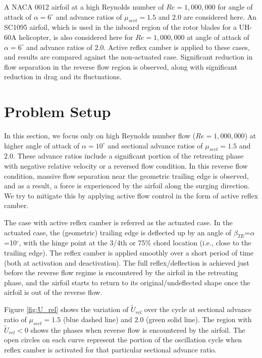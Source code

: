 A NACA 0012 airfoil at a high Reynolds number of $Re=1,000,000$ for angle of attack of $\alpha=6^\circ$ and advance ratios of $\mu_{sect}=1.5$ and $2.0$ are considered here.
An SC1095 airfoil, which is used in the inboard region of the rotor blades for a UH-60A helicopter, is also considered here for $Re=1,000,000$ at angle of attack of $\alpha=6^\circ$ and advance ratios of $2.0$.
Active reflex camber is applied to these cases, and results are compared against the non-actuated case.
Significant reduction in flow separation in the reverse flow region is observed, along with significant reduction in drag and its fluctuations.
 

\section{Problem Setup}


In this section, we focus only on high Reynolds number flow ($Re=1,000,000$) at higher angle of attack of $\alpha=10^\circ$ and sectional advance ratios of $\mu_{sect}= 1.5$ and $2.0$. 
These advance ratios include a significant portion of the retreating phase with negative relative velocity or a reversed flow condition. 
In this reverse flow condition, massive flow separation near the geometric trailing edge is observed, and as a result, a force is experienced by the airfoil along the surging direction. 
We try to mitigate this by applying active flow control in the form of active reflex camber. 

The case with active reflex camber is referred as the actuated case.
In the actuated case, the (geometric) trailing edge is deflected up by an angle of $\beta_{TE}$=$\alpha$=10$^\circ$, with the hinge point at the 3/4th or 75\% chord location (i.e., close to the trailing edge).
The reflex camber is applied smoothly over a short period of time (both at activation and deactivation).
The full reflex/deflection is achieved just before the reverse flow regime is encountered by the airfoil in the retreating phase, and the airfoil starts to return to its original/undeflected shape once the airfoil is out of the reverse flow.

Figure \ref{fig:U_rel} shows the variation of $\tilde{U}_{rel}$ over the cycle at sectional advance ratio of $\mu_{sect}=1.5$ (blue dashed line) and $2.0$ (green solid line).
The region with $\tilde{U}_{rel}<0$ shows the phases when reverse flow is encountered by the airfoil.
The open circles on each curve represent the portion of the oscillation cycle when reflex camber is activated for that particular sectional advance ratio.


